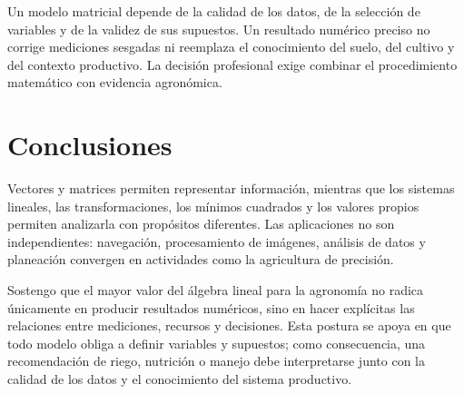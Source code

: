 \documentclass[spanish,letterpaper,oneside]{article}
\begin{document}
Un modelo matricial depende de la calidad de los datos, de la selección de variables y de la validez de sus supuestos. Un resultado numérico preciso no corrige mediciones sesgadas ni reemplaza el conocimiento del suelo, del cultivo y del contexto productivo. La decisión profesional exige combinar el procedimiento matemático con evidencia agronómica.

\clearpage
\section{Conclusiones}
Vectores y matrices permiten representar información, mientras que los sistemas lineales, las transformaciones, los mínimos cuadrados y los valores propios permiten analizarla con propósitos diferentes. Las aplicaciones no son independientes: navegación, procesamiento de imágenes, análisis de datos y planeación convergen en actividades como la agricultura de precisión.

Sostengo que el mayor valor del álgebra lineal para la agronomía no radica únicamente en producir resultados numéricos, sino en hacer explícitas las relaciones entre mediciones, recursos y decisiones. Esta postura se apoya en que todo modelo obliga a definir variables y supuestos; como consecuencia, una recomendación de riego, nutrición o manejo debe interpretarse junto con la calidad de los datos y el conocimiento del sistema productivo.


\end{document}
